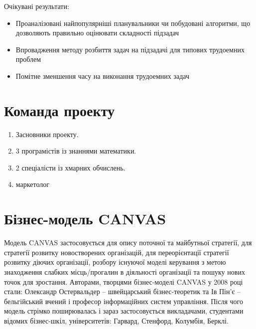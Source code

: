 Очікувані результати:
\begin{itemize}
  \item Проаналізовані найпопулярніші планувальники чи побудовані алгоритми, що дозволяють правильно оцінювати складності підзадач
  \item Впровадження методу розбиття задач на підзадачі для типових трудоемних проблем
  \item Помітне зменшення часу на виконання трудоемних задач
\end{itemize}

\section{Команда проекту}
\begin{enumerate}
  \item Засновники проекту.
  \item 3 програмістів із знаннями математики.
  \item 2 спеціалісти із хмарних обчислень.
  \item маркетолог
\end{enumerate}

\section{Бізнес-модель CANVAS}
Модель CANVAS застосовується для опису поточної та майбутньої стратегії,
для стратегії розвитку новостворених організацій, для переорієнтації
стратегії розвитку діючих організації, розбору існуючої моделі
керування з метою знаходження слабких місць/прогалин в діяльності організації
та пошуку нових точок для зростання. Авторами, творцями бізнес-моделі CANVAS
у 2008 році стали: Олександр Остервальдер –  швейцарський бізнес-теоретик та
Ів Пін’є –  бельгійський вчений і професор інформаційних систем управління.
Після чого модель стрімко поширювалась і зараз застосовується викладачами,
студентами відомих бізнес-шкіл, університетів: Гарвард, Стенфорд, Колумбія, Берклі.\\

